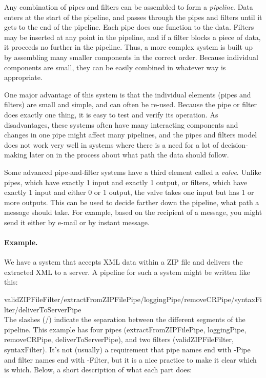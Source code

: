 Any combination of pipes and filters can be assembled to form a \textit{pipeline}. Data enters at the start of the pipeline, and passes through the pipes and filters until it gets to the end of the pipeline. Each pipe does one function to the data. Filters may be inserted at any point in the pipeline, and if a filter blocks a piece of data, it proceeds no further in the pipeline. Thus, a more complex system is built up by assembling many smaller components in the correct order. Because individual components are small, they can be easily combined in whatever way is appropriate.

One major advantage of this system is that the individual elements (pipes and filters) are small and simple, and can often be re-used. Because the pipe or filter does exactly one thing, it is easy to test and verify its operation. As disadvantages, these systems often have many interacting components and changes in one pipe might affect many pipelines, and the pipes and filters model does not work very well in systems where there is a need for a lot of decision-making later on in the process about what path the data should follow.

Some advanced pipe-and-filter systems have a third element called a \textit{valve}. Unlike pipes, which have exactly 1 input and exactly 1 output, or filters, which have exactly 1 input and either 0 or 1 output, the valve takes one input but has 1 or more outputs. This can be used to decide farther down the pipeline, what path a message should take. For example, based on the recipient of a message, you might send it either by e-mail or by instant message.

\paragraph{Example.} We have a system that accepts XML data within a ZIP file and delivers the extracted XML to a server. A pipeline for such a system might be written like this:

validZIPFileFilter/extractFromZIPFilePipe/loggingPipe/removeCRPipe/syntaxFilter/deliverToServerPipe\\

The slashes (/) indicate the separation between the different segments of the pipeline. This example has four pipes (extractFromZIPFilePipe, loggingPipe, removeCRPipe, deliverToServerPipe), and two filters (validZIPFileFilter, syntaxFilter). It's not (usually) a requirement that pipe names end with -Pipe and filter names end with -Filter, but it is a nice practice to make it clear which is which. Below, a short description of what each part does:

